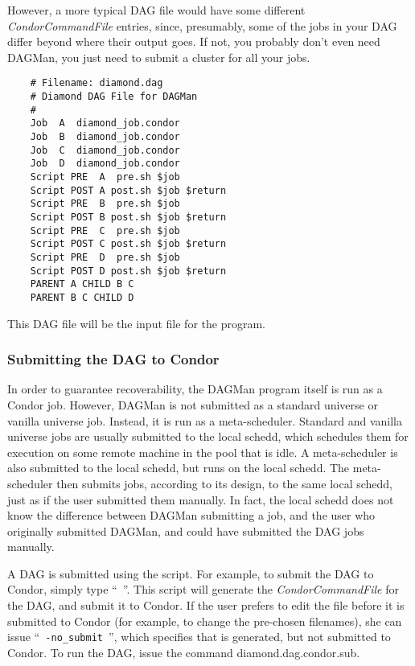 However, a more typical DAG file would have some different 
\textit{CondorCommandFile} entries, since, presumably, some of the
jobs in your DAG differ beyond where their output goes.
If not, you probably don't even need DAGMan, you just need to submit a
cluster for all your jobs.

\begin{verbatim}
	# Filename: diamond.dag
	# Diamond DAG File for DAGMan
	#
	Job  A  diamond_job.condor
	Job  B  diamond_job.condor
	Job  C  diamond_job.condor
	Job  D  diamond_job.condor
	Script PRE  A  pre.sh $job
	Script POST A post.sh $job $return
	Script PRE  B  pre.sh $job
	Script POST B post.sh $job $return
	Script PRE  C  pre.sh $job
	Script POST C post.sh $job $return
	Script PRE  D  pre.sh $job
	Script POST D post.sh $job $return
	PARENT A CHILD B C
	PARENT B C CHILD D
\end{verbatim}

This DAG file will be the input file for the  program.

\subsubsection{\label{dagman:submitdag}Submitting the DAG to Condor}

In order to guarantee recoverability, the DAGMan program itself is run as a
Condor job.  However, DAGMan is not submitted as a standard universe or
vanilla universe job.  Instead, it is run as a meta-scheduler.  Standard and
vanilla universe jobs are usually submitted to the local schedd, which
schedules them for execution on some remote machine in the pool that is idle.
A meta-scheduler is also submitted to the local schedd, but runs on the local
schedd.  The meta-scheduler then submits jobs, according to its design, to the
same local schedd, just as if the user submitted them manually.  In fact, the
local schedd does not know the difference between DAGMan submitting a job, and
the user who originally submitted DAGMan, and could have submitted the DAG
jobs manually.

A DAG is submitted using the  script.  For
example, to submit the  DAG to Condor, simply type
``{\tt {} }''.
This script will generate the 
\textit{CondorCommandFile} for the DAG, and submit it to Condor.
If the user prefers to edit the  file before
it is submitted to Condor (for example, to change the pre-chosen
filenames), she can issue ``{\tt {} -no\_submit
}'', which specifies that 
is generated, but not submitted to Condor.
To run the DAG, issue the command 
diamond.dag.condor.sub. 

